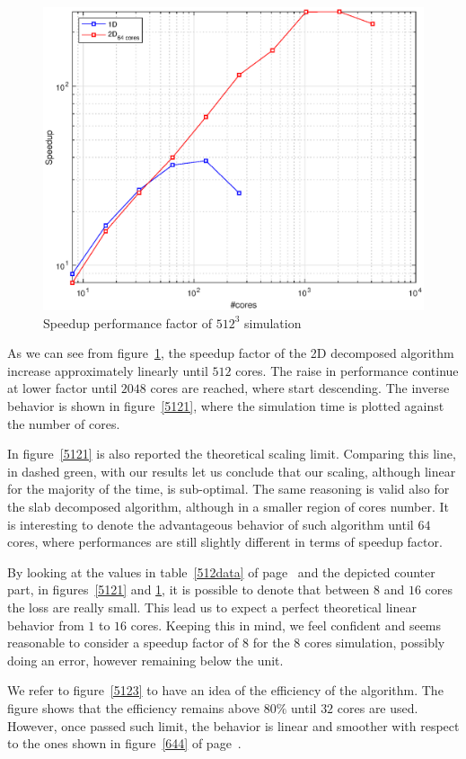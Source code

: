 \begin{figure}
\begin{center}
\includegraphics[scale=0.6]{grafici/5122}
\caption{Speedup performance factor of $512^3$ simulation}
\label{5122}
\end{center}
\end{figure}

As we can see from figure~\ref{5122}, the speedup factor of the 2D decomposed algorithm increase approximately linearly until $512$ cores. The raise in performance continue at lower factor until $2048$ cores are reached, where start descending.
The inverse behavior is shown in figure~\ref{5121}, where the simulation time is plotted against the number of cores.
\par
In figure~\ref{5121} is also reported the theoretical scaling limit. Comparing this line, in dashed green, with our results let us conclude that our scaling, although linear for the majority of the time, is sub-optimal. 
The same reasoning is valid also for the slab decomposed algorithm, although in a smaller region of cores number.
It is interesting to denote the advantageous behavior of such algorithm until $64$ cores, where performances are still slightly different in terms of speedup factor. 
\par
By looking at the values in table~\ref{512data} of page~\pageref{512data} and the depicted counter part, in figures~\ref{5121} and \ref{5122}, it is possible to denote that between $8$ and $16$ cores the loss are really small. This lead us to expect a perfect theoretical linear behavior from $1$ to $16$ cores. Keeping this in mind, we feel confident and seems reasonable to consider a speedup factor of $8$ for the $8$ cores simulation, possibly doing an error, however remaining below the unit. \\
\par
We refer to figure~\ref{5123} to have an idea of the efficiency of the algorithm. The figure shows that the efficiency remains above $80\%$ until $32$ cores are used. However, once passed such limit, the behavior is linear and smoother with respect to the ones shown in figure~\ref{644} of page~\pageref{644}. 
\par

